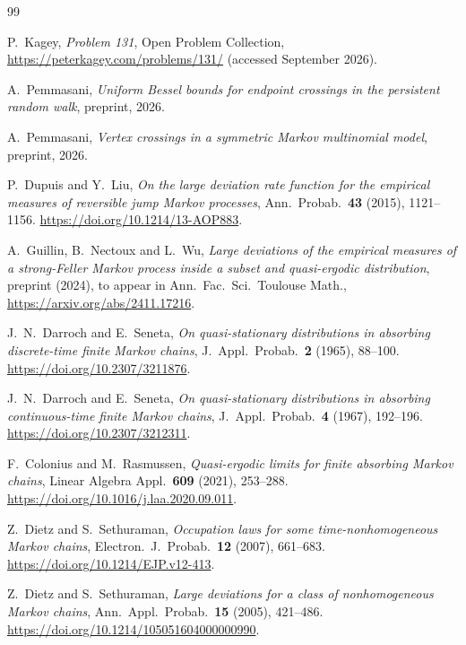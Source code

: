 \documentclass[11pt]{article}
\theoremstyle{definition}
\theoremstyle{remark}
\begin{document}
\begin{thebibliography}{99}\small\setlength{\baselineskip}{11pt}\setlength{\itemsep}{0pt}\setlength{\parsep}{0pt}

P.~Kagey, \emph{Problem 131}, Open Problem Collection,
\url{https://peterkagey.com/problems/131/} (accessed September 2026).

A.~Pemmasani, \emph{Uniform Bessel bounds for endpoint crossings in the
persistent random walk}, preprint, 2026.

A.~Pemmasani, \emph{Vertex crossings in a symmetric Markov multinomial
model}, preprint, 2026.

P.~Dupuis and Y.~Liu, \emph{On the large deviation rate function for the
empirical measures of reversible jump Markov processes}, Ann.~Probab.~\textbf{43}
(2015), 1121--1156. \url{https://doi.org/10.1214/13-AOP883}.

A.~Guillin, B.~Nectoux and L.~Wu, \emph{Large deviations of the empirical
measures of a strong-Feller Markov process inside a subset and quasi-ergodic
distribution}, preprint (2024), to appear in Ann.~Fac.~Sci.~Toulouse Math.,
\url{https://arxiv.org/abs/2411.17216}.

J.~N.~Darroch and E.~Seneta, \emph{On quasi-stationary distributions in
absorbing discrete-time finite Markov chains}, J.~Appl.~Probab.~\textbf{2}
(1965), 88--100. \url{https://doi.org/10.2307/3211876}.

J.~N.~Darroch and E.~Seneta, \emph{On quasi-stationary distributions in
absorbing continuous-time finite Markov chains}, J.~Appl.~Probab.~\textbf{4}
(1967), 192--196. \url{https://doi.org/10.2307/3212311}.

F.~Colonius and M.~Rasmussen, \emph{Quasi-ergodic limits for finite
absorbing Markov chains}, Linear Algebra Appl.~\textbf{609} (2021), 253--288.
\url{https://doi.org/10.1016/j.laa.2020.09.011}.

Z.~Dietz and S.~Sethuraman, \emph{Occupation laws for some
time-nonhomogeneous Markov chains}, Electron.~J.~Probab.~\textbf{12} (2007),
661--683. \url{https://doi.org/10.1214/EJP.v12-413}.

Z.~Dietz and S.~Sethuraman, \emph{Large deviations for a class of
nonhomogeneous Markov chains}, Ann.~Appl.~Probab.~\textbf{15} (2005),
421--486. \url{https://doi.org/10.1214/105051604000000990}.


\end{thebibliography}
\end{document}
